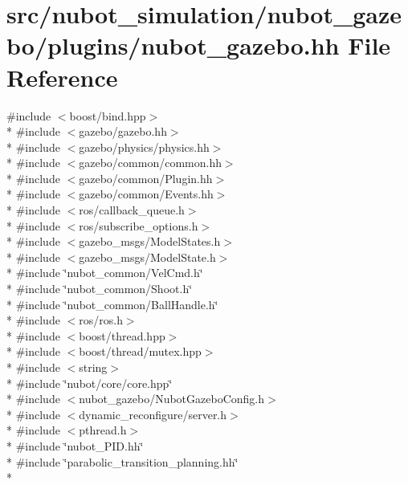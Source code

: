 \hypertarget{nubot__gazebo_8hh}{\section{src/nubot\-\_\-simulation/nubot\-\_\-gazebo/plugins/nubot\-\_\-gazebo.hh File Reference}
\label{nubot__gazebo_8hh}
}
{\ttfamily \#include $<$boost/bind.\-hpp$>$}\\*
{\ttfamily \#include $<$gazebo/gazebo.\-hh$>$}\\*
{\ttfamily \#include $<$gazebo/physics/physics.\-hh$>$}\\*
{\ttfamily \#include $<$gazebo/common/common.\-hh$>$}\\*
{\ttfamily \#include $<$gazebo/common/\-Plugin.\-hh$>$}\\*
{\ttfamily \#include $<$gazebo/common/\-Events.\-hh$>$}\\*
{\ttfamily \#include $<$ros/callback\-\_\-queue.\-h$>$}\\*
{\ttfamily \#include $<$ros/subscribe\-\_\-options.\-h$>$}\\*
{\ttfamily \#include $<$gazebo\-\_\-msgs/\-Model\-States.\-h$>$}\\*
{\ttfamily \#include $<$gazebo\-\_\-msgs/\-Model\-State.\-h$>$}\\*
{\ttfamily \#include \char`\"{}nubot\-\_\-common/\-Vel\-Cmd.\-h\char`\"{}}\\*
{\ttfamily \#include \char`\"{}nubot\-\_\-common/\-Shoot.\-h\char`\"{}}\\*
{\ttfamily \#include \char`\"{}nubot\-\_\-common/\-Ball\-Handle.\-h\char`\"{}}\\*
{\ttfamily \#include $<$ros/ros.\-h$>$}\\*
{\ttfamily \#include $<$boost/thread.\-hpp$>$}\\*
{\ttfamily \#include $<$boost/thread/mutex.\-hpp$>$}\\*
{\ttfamily \#include $<$string$>$}\\*
{\ttfamily \#include \char`\"{}nubot/core/core.\-hpp\char`\"{}}\\*
{\ttfamily \#include $<$nubot\-\_\-gazebo/\-Nubot\-Gazebo\-Config.\-h$>$}\\*
{\ttfamily \#include $<$dynamic\-\_\-reconfigure/server.\-h$>$}\\*
{\ttfamily \#include $<$pthread.\-h$>$}\\*
{\ttfamily \#include \char`\"{}nubot\-\_\-\-P\-I\-D.\-hh\char`\"{}}\\*
{\ttfamily \#include \char`\"{}parabolic\-\_\-transition\-\_\-planning.\-hh\char`\"{}}\\*
